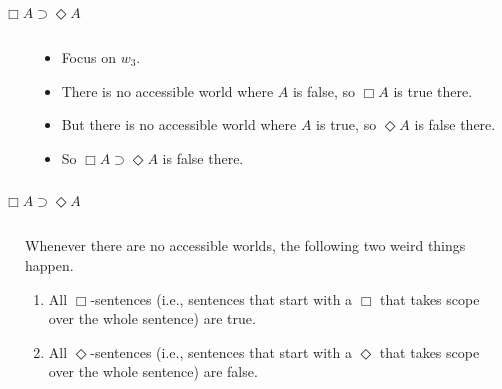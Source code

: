 \documentclass[
  14pt,
  letterpaper,
  ignorenonframetext,
  aspectratio=169,
  handout]{beamer}
\begin{document}
\begin{frame}{\(\Box A \supset \Diamond A\)}
\protect\hypertarget{box-a-supset-diamond-a}{}
\begin{columns}
    \begin{column}{0.45\textwidth}
    \end{column}
    \begin{column}{0.5\textwidth}
    \begin{itemize}
    \item Focus on $w_3$.
    \item There is no accessible world where $A$ is false, so $\Box A$ is true there.
    \item But there is no accessible world where $A$ is true, so $\Diamond A$ is false there.
    \item So $\Box A \supset \Diamond A$ is false there.
    \end{itemize}
\end{column}
\end{columns}
\end{frame}

\begin{frame}{\(\Box A \supset \Diamond A\)}
\protect\hypertarget{box-a-supset-diamond-a-1}{}
\begin{columns}
    \begin{column}{0.45\textwidth}
    \end{column}
    \begin{column}{0.5\textwidth}
    Whenever there are no accessible worlds, the following two weird things happen.
    \begin{enumerate}
    \item All $\Box$-sentences (i.e., sentences that start with a $\Box$ that takes scope over the whole sentence) are true.
    \item All $\Diamond$-sentences (i.e., sentences that start with a $\Diamond$ that takes scope over the whole sentence) are false.
    \end{enumerate}
   \end{column}
\end{columns}
\end{frame}
\end{document}
